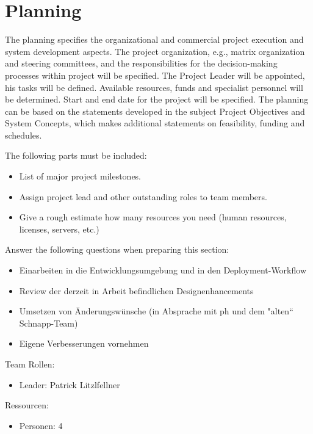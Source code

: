\documentclass[12pt]{article}
\theoremstyle{definition}
\newenvironment{explanation}{%
   \setlength{\parindent}{0pt}
   \itshape
   \color{blue}
}{}
\begin{document}
\pagebreak
\section{Planning}
\begin{explanation}
The planning specifies the organizational and commercial project execution and system development aspects. The project organization, e.g., matrix organization and steering committees, and the responsibilities for the decision-making processes within project will be specified.
The Project Leader will be appointed, his tasks will be defined. Available resources, funds and specialist personnel will be determined. Start and end date for the project will be specified. The planning can be based on the statements developed in the subject Project Objectives and System Concepts, which makes additional statements on feasibility, funding and schedules.

The following parts must be included:
\begin{itemize}
\item List of major project milestones.
\item Assign project lead and other outstanding roles to team members.
\item Give a rough estimate how many resources you need (human resources, licenses, servers, etc.)
\end{itemize}
\end{explanation}
Answer the following questions when preparing this section:
\begin{itemize}
\item Einarbeiten in die Entwicklungsumgebung und in den Deployment-Workflow
\item Review der derzeit in Arbeit befindlichen Designenhancements
\item Umsetzen von Änderungswünsche (in Absprache mit ph und dem "alten“ Schnapp-Team)
\item Eigene Verbesserungen vornehmen
\end{itemize}
Team Rollen:
\begin{itemize}
\item Leader: Patrick Litzlfellner
\end{itemize}
Ressourcen:
\begin{itemize}
\item Personen: 4 	
\end{itemize}
\end{document}
